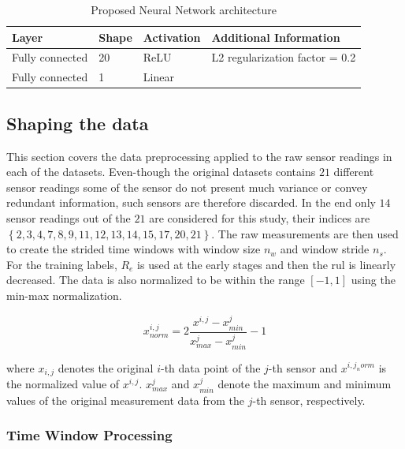 \begin{table}[!htb]
\centering
\begin{tabular}{l l l l}
	\hline
	Layer & Shape & Activation & Additional Information\\
  	\hline
  	Fully connected & 20 & ReLU & L2 regularization factor = 0.2\\
  	Fully connected & 1 & Linear & \\
  	\hline
\end{tabular}
\caption{Proposed Neural Network architecture}
\label{table:proposed_nn}
\end{table}

\subsection{Shaping the data}

This section covers the data preprocessing applied to the raw sensor readings in each of the datasets. Even-though the original datasets contains $21$ different sensor readings some of the sensor do not present much variance or convey redundant information, such sensors are therefore discarded. In the end only $14$ sensor readings out of the $21$ are considered for this study, their indices are $\left\lbrace 2, 3, 4, 7, 8, 9, 11, 12, 13, 14, 15, 17, 20, 21 \right\rbrace$. The raw measurements are then used to create the strided time windows with window size $n_w$ and window stride $n_s$. For the training labels, $R_e$ is used at the early stages and then the \gls{rul} is linearly decreased. The data is also normalized to be within the range $\left[ -1,1 \right]$ using the min-max normalization.

\begin{equation}
x^{i,j}_{norm} = 2 \frac{x^{i,j} - x^{j}_{min}}{x^{j}_{max} - x^{j}_{min}} - 1
\label{eq:min_max_norm}
\end{equation}

where $x_{i,j}$ denotes the original $i$-th data point of the $j$-th sensor and $x^{i,j_norm}$ is the normalized value of $x^{i,j}$.  $x^{j}_{max}$ and $x^{j}_{min}$ denote the maximum and minimum values of the original measurement data from the $j$-th sensor, respectively.

\subsubsection{Time Window Processing}


